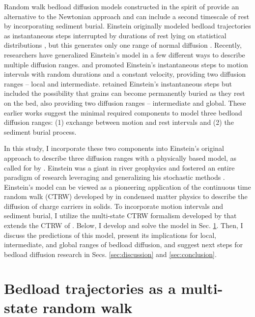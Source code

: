 Random walk bedload diffusion models constructed in the spirit of \citet{Einstein1937} provide an alternative to the Newtonian approach and can include a second timescale of rest by incorporating sediment burial.
Einstein originally modeled bedload trajectories as instantaneous steps interrupted by durations of rest lying on statistical distributions \citep{Hassan1991}, but this generates only one range of normal diffusion \citep{Einstein1937,Hubbell1964,Nakagawa1976}.
Recently, researchers have generalized Einstein's model in a few different ways to describe multiple diffusion ranges.
\citet{Lisle1998} and \citet{Lajeunesse2017} promoted Einstein's instantaneous steps to motion intervals with random durations and a constant velocity, providing two diffusion ranges -- local and intermediate.
\citet{Wu2019} retained Einstein's instantaneous steps but included the possibility that grains can become permanently buried as they rest on the bed, also providing two diffusion ranges -- intermediate and global. 
These earlier works suggest the minimal required components to model three bedload diffusion ranges: (1) exchange between motion and rest intervals and (2) the sediment burial process.

In this study, I incorporate these two components into Einstein's original approach to describe three diffusion ranges with a physically based model, as called for by \citet{Nikora2002}.
Einstein was a giant in river geophysics and fostered an entire paradigm of research leveraging and generalizing his stochastic methods \citep{Hubbell1964, Yano1969, Yang1971, Gordon1972, Nakagawa1976,Paintal1971}.
Einstein's model can be viewed as a pioneering application of the continuous time random walk (CTRW) developed by \citet{Montroll1965} in condensed matter physics to describe the diffusion of charge carriers in solids.
To incorporate motion intervals and sediment burial, I utilize the multi-state CTRW formalism developed by \citet{Weiss1976, Weiss1994} that extends the CTRW of \citet{Montroll1965}.
Below, I develop and solve the model in Sec. \ref{sec:model}. Then, I discuss the predictions of this model, present its implications for local, intermediate, and global ranges of bedload diffusion, and suggest next steps for bedload diffusion research in Secs. \ref{sec:discussion} and \ref{sec:conclusion}.

\section{Bedload trajectories as a multi-state random walk}
\label{sec:model}
